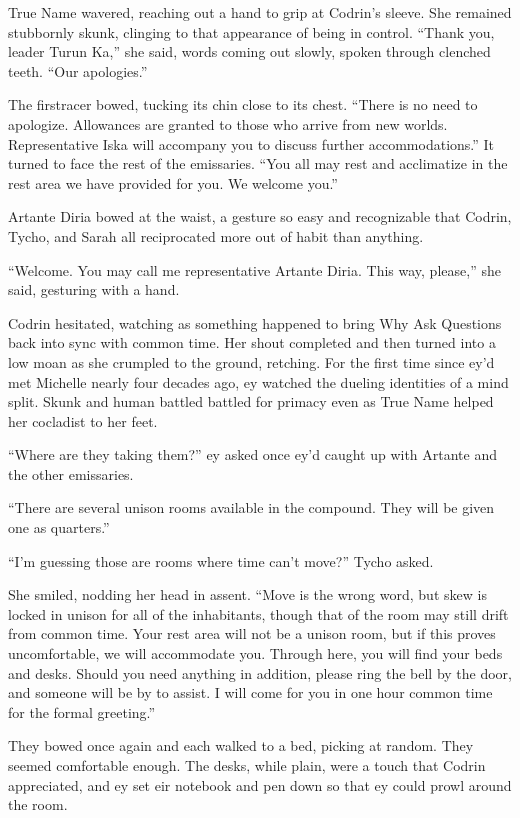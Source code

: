 True Name wavered, reaching out a hand to grip at Codrin's sleeve. She remained stubbornly skunk, clinging to that appearance of being in control. ``Thank you, leader Turun Ka,'' she said, words coming out slowly, spoken through clenched teeth. ``Our apologies.''

The firstracer bowed, tucking its chin close to its chest. ``There is no need to apologize. Allowances are granted to those who arrive from new worlds. Representative Iska will accompany you to discuss further accommodations.'' It turned to face the rest of the emissaries. ``You all may rest and acclimatize in the rest area we have provided for you. We welcome you.''

Artante Diria bowed at the waist, a gesture so easy and recognizable that Codrin, Tycho, and Sarah all reciprocated more out of habit than anything.

``Welcome. You may call me representative Artante Diria. This way, please,'' she said, gesturing with a hand.

Codrin hesitated, watching as something happened to bring Why Ask Questions back into sync with common time. Her shout completed and then turned into a low moan as she crumpled to the ground, retching. For the first time since ey'd met Michelle nearly four decades ago, ey watched the dueling identities of a mind split. Skunk and human battled battled for primacy even as True Name helped her cocladist to her feet.

``Where are they taking them?'' ey asked once ey'd caught up with Artante and the other emissaries.

``There are several unison rooms available in the compound. They will be given one as quarters.''

``I'm guessing those are rooms where time can't move?'' Tycho asked.

She smiled, nodding her head in assent. ``Move is the wrong word, but skew is locked in unison for all of the inhabitants, though that of the room may still drift from common time. Your rest area will not be a unison room, but if this proves uncomfortable, we will accommodate you. Through here, you will find your beds and desks. Should you need anything in addition, please ring the bell by the door, and someone will be by to assist. I will come for you in one hour common time for the formal greeting.''

They bowed once again and each walked to a bed, picking at random. They seemed comfortable enough. The desks, while plain, were a touch that Codrin appreciated, and ey set eir notebook and pen down so that ey could prowl around the room.

